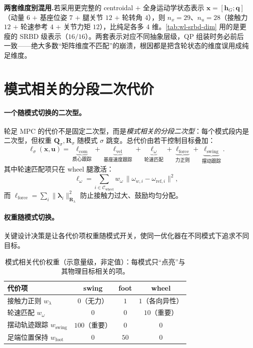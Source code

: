 \begin{note}
\textbf{两套维度别混用.}\;若采用更完整的 centroidal $+$ 全身运动学状态表示 $\mathbf{x}=[\mathbf{h}_G;\mathbf{q}]$（动量 $6$ $+$ 基座位姿 $7$ $+$ 腿关节 $12$ $+$ 轮转角 $4$），则 $n_x=29$、$n_u=28$（接触力 $12$ $+$ 轮速参考 $4$ $+$ 关节力矩 $12$），比纯足各多 $4$ 维。\cref{tab:wl-srbd-dim} 用的是更瘦的 SRBD 级表示（$16/16$）。两套表示对应不同抽象层级，QP 组装时务必前后一致——绝大多数“矩阵维度不匹配”的崩溃，根因都是把含轮状态的维度误用成纯足维度。
\end{note}

\section{模式相关的分段二次代价}
\label{sec:wl-cost}

\paragraph{一个随模式切换的二次型。}
轮足 MPC 的代价不是固定二次型，而是\emph{模式相关的分段二次型}：每个模式段内是二次型，但权重 $\mathbf{Q}_\sigma,\mathbf{R}_\sigma$ 随模式 $\sigma$ 跳变。总代价由若干控制目标叠加：
\begin{equation}
  \ell_\sigma(\mathbf{x},\mathbf{u})=
  \underbrace{\ell_{\mathrm{com}}}_{\text{质心跟踪}}
  +\underbrace{\ell_{\mathrm{vel}}}_{\text{基座速度跟踪}}
  +\underbrace{\ell_{\omega}}_{\text{轮速匹配}}
  +\underbrace{\ell_{\mathrm{force}}}_{\text{力正则}}
  +\underbrace{\ell_{\mathrm{swing}}}_{\text{摆动跟踪}}.
  \label{eq:wl-cost}
\end{equation}
其中轮速匹配项只在 wheel 腿激活：
\begin{equation}
  \ell_{\omega}=\sum_{i\in\mathcal{C}_{\mathrm{wheel}}}w_\omega\,\big\|\omega_{w,i}-\omega_{\mathrm{ref},i}\big\|^2,
  \label{eq:wl-ellomega}
\end{equation}
而 $\ell_{\mathrm{force}}=\sum_i\|\boldsymbol\lambda_i\|_{\mathbf{R}_\lambda}^2$ 防止接触力过大、鼓励均匀分配。

\paragraph{权重随模式切换。}
关键设计决策是让各代价项权重随模式开关，使同一优化器在不同模式下追求不同目标。

\begin{table}[H]\centering\small
\caption{模式相关代价权重（示意量级，非定值）：每模式只“点亮”与其物理目标相关的项。}
\label{tab:wl-modeweights}
\begin{tabular}{lccc}
\toprule
代价项 & swing & foot & wheel \\
\midrule
接触力正则 $w_\lambda$ & $0$（无力） & $1$ & $1$（各向异性） \\
轮速匹配 $w_\omega$ & $0$ & $0$ & $10$（重要） \\
摆动轨迹跟踪 $w_{\mathrm{swing}}$ & $100$（重要） & $0$ & $0$ \\
足端位置保持 $w_{\mathrm{foot}}$ & $0$ & $50$ & $0$ \\
\bottomrule
\end{tabular}
\end{table}

